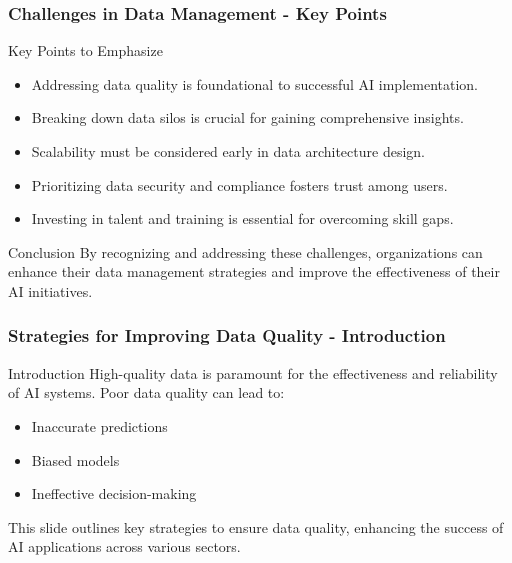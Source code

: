 \documentclass[aspectratio=169]{beamer}
\begin{document}
\begin{frame}[fragile]
    \frametitle{Challenges in Data Management - Key Points}
    \begin{block}{Key Points to Emphasize}
        \begin{itemize}
            \item Addressing data quality is foundational to successful AI implementation.
            \item Breaking down data silos is crucial for gaining comprehensive insights.
            \item Scalability must be considered early in data architecture design.
            \item Prioritizing data security and compliance fosters trust among users.
            \item Investing in talent and training is essential for overcoming skill gaps.
        \end{itemize}
    \end{block}

    \begin{block}{Conclusion}
        By recognizing and addressing these challenges, organizations can enhance their data management strategies and improve the effectiveness of their AI initiatives.
    \end{block}
\end{frame}

\begin{frame}[fragile]
    \frametitle{Strategies for Improving Data Quality - Introduction}
    \begin{block}{Introduction}
        High-quality data is paramount for the effectiveness and reliability of AI systems. 
        Poor data quality can lead to:
        \begin{itemize}
            \item Inaccurate predictions
            \item Biased models
            \item Ineffective decision-making
        \end{itemize}
        This slide outlines key strategies to ensure data quality, enhancing the success of AI applications across various sectors.
    \end{block}
\end{frame}
\end{document}
